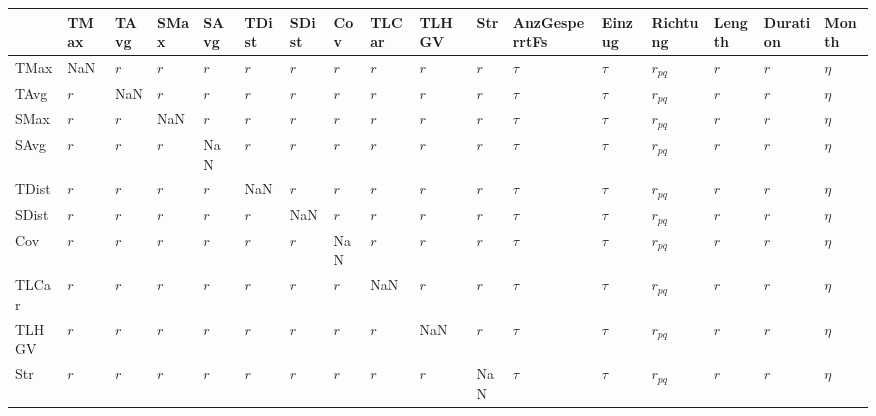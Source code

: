 \begin{tabular}{lllllllllllllllll}
\toprule
{} &      TMax &      TAvg &      SMax &      SAvg &     TDist &     SDist &       Cov &     TLCar &     TLHGV &       Str & AnzGesperrtFs &  Einzug &  Richtung &    Length &  Duration &   Month \\
\midrule
TMax          &       NaN &       $r$ &       $r$ &       $r$ &       $r$ &       $r$ &       $r$ &       $r$ &       $r$ &       $r$ &        $\tau$ &  $\tau$ &  $r_{pq}$ &       $r$ &       $r$ &  $\eta$ \\
TAvg          &       $r$ &       NaN &       $r$ &       $r$ &       $r$ &       $r$ &       $r$ &       $r$ &       $r$ &       $r$ &        $\tau$ &  $\tau$ &  $r_{pq}$ &       $r$ &       $r$ &  $\eta$ \\
SMax          &       $r$ &       $r$ &       NaN &       $r$ &       $r$ &       $r$ &       $r$ &       $r$ &       $r$ &       $r$ &        $\tau$ &  $\tau$ &  $r_{pq}$ &       $r$ &       $r$ &  $\eta$ \\
SAvg          &       $r$ &       $r$ &       $r$ &       NaN &       $r$ &       $r$ &       $r$ &       $r$ &       $r$ &       $r$ &        $\tau$ &  $\tau$ &  $r_{pq}$ &       $r$ &       $r$ &  $\eta$ \\
TDist         &       $r$ &       $r$ &       $r$ &       $r$ &       NaN &       $r$ &       $r$ &       $r$ &       $r$ &       $r$ &        $\tau$ &  $\tau$ &  $r_{pq}$ &       $r$ &       $r$ &  $\eta$ \\
SDist         &       $r$ &       $r$ &       $r$ &       $r$ &       $r$ &       NaN &       $r$ &       $r$ &       $r$ &       $r$ &        $\tau$ &  $\tau$ &  $r_{pq}$ &       $r$ &       $r$ &  $\eta$ \\
Cov           &       $r$ &       $r$ &       $r$ &       $r$ &       $r$ &       $r$ &       NaN &       $r$ &       $r$ &       $r$ &        $\tau$ &  $\tau$ &  $r_{pq}$ &       $r$ &       $r$ &  $\eta$ \\
TLCar         &       $r$ &       $r$ &       $r$ &       $r$ &       $r$ &       $r$ &       $r$ &       NaN &       $r$ &       $r$ &        $\tau$ &  $\tau$ &  $r_{pq}$ &       $r$ &       $r$ &  $\eta$ \\
TLHGV         &       $r$ &       $r$ &       $r$ &       $r$ &       $r$ &       $r$ &       $r$ &       $r$ &       NaN &       $r$ &        $\tau$ &  $\tau$ &  $r_{pq}$ &       $r$ &       $r$ &  $\eta$ \\
Str           &       $r$ &       $r$ &       $r$ &       $r$ &       $r$ &       $r$ &       $r$ &       $r$ &       $r$ &       NaN &        $\tau$ &  $\tau$ &  $r_{pq}$ &       $r$ &       $r$ &  $\eta$ \\

\end{tabular}
